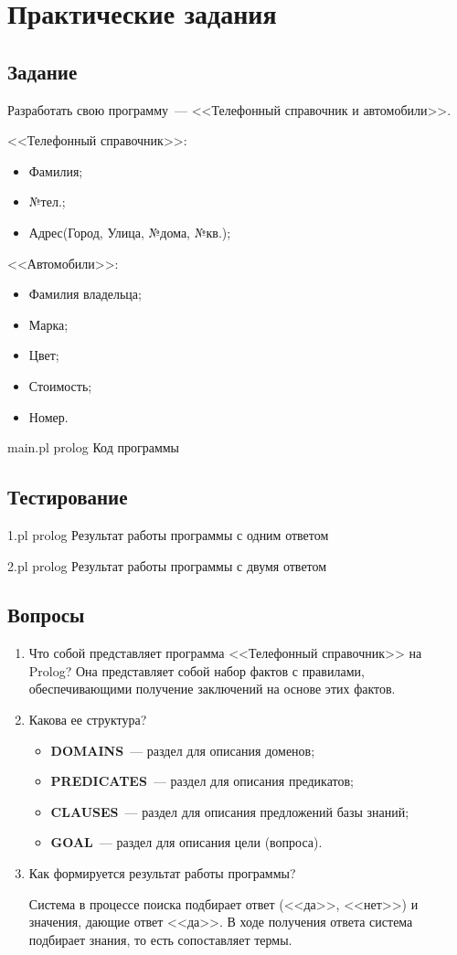 \chapter{Практические задания}

\section{Задание}
Разработать свою программу~--- <<Телефонный справочник и автомобили>>. 

<<Телефонный справочник>>:
\begin{itemize}
	\item Фамилия;
	\item №тел.;
	\item Адрес(Город, Улица, №дома, №кв.);
\end{itemize}

<<Автомобили>>:
\begin{itemize}
	\item Фамилия владельца;
	\item Марка;
	\item Цвет;
	\item Стоимость;
	\item Номер.
\end{itemize}

{main.pl}
{prolog}
{Код программы}

\section{Тестирование}
{1.pl}
{prolog}
{Результат работы программы с одним ответом}

{2.pl}
{prolog}
{Результат работы программы с двумя ответом}

\section{Вопросы}
\begin{enumerate}
	\item Что собой представляет программа <<Телефонный справочник>> на Prolog?
	Она представляет собой набор фактов с правилами, обеспечивающими получение заключений на основе этих фактов.
	
	\item Какова ее структура?
	\begin{itemize}
		\item \textbf{DOMAINS}~--- раздел для описания доменов;
		\item \textbf{PREDICATES}~--- раздел для описания предикатов;
		\item \textbf{CLAUSES}~--- раздел для описания предложений базы знаний;
		\item \textbf{GOAL}~--- раздел для описания цели (вопроса).
	\end{itemize}
	
	\item Как формируется результат работы программы?
	
	Система в процессе поиска подбирает ответ (<<да>>, <<нет>>) и значения, дающие ответ <<да>>. В ходе получения ответа система подбирает знания, то есть сопоставляет термы.
\end{enumerate}
